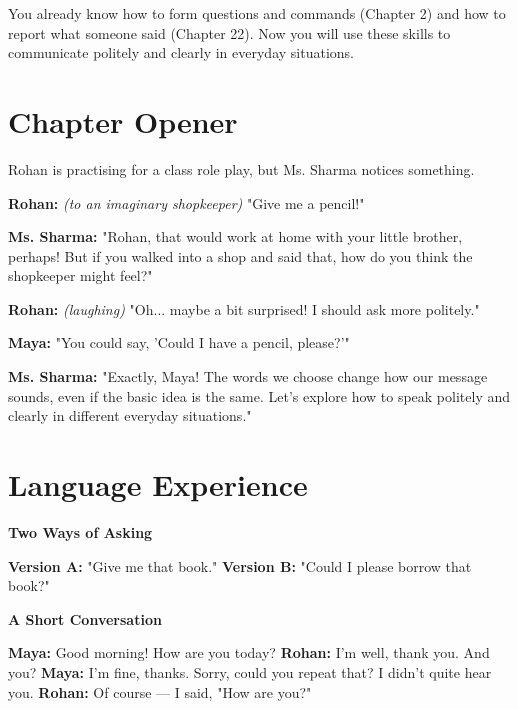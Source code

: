 \begin{rememberbox}
You already know how to form questions and commands (Chapter 2) and how to report what someone said (Chapter 22). Now you will use these skills to communicate politely and clearly in everyday situations.
\end{rememberbox}

\section{Chapter Opener}
Rohan is practising for a class role play, but Ms. Sharma notices something.

\textbf{Rohan:} \textit{(to an imaginary shopkeeper)} "Give me a pencil!"

\textbf{Ms. Sharma:} "Rohan, that would work at home with your little brother, perhaps! But if you walked into a shop and said that, how do you think the shopkeeper might feel?"

\textbf{Rohan:} \textit{(laughing)} "Oh... maybe a bit surprised! I should ask more politely."

\textbf{Maya:} "You could say, 'Could I have a pencil, please?'"

\textbf{Ms. Sharma:} "Exactly, Maya! The words we choose change how our message sounds, even if the basic idea is the same. Let's explore how to speak politely and clearly in different everyday situations."

\section{Language Experience}
\textbf{Two Ways of Asking}

\begin{tcolorbox}[colback=gray!5, colframe=gray!50, sharp corners, boxsep=0pt, left=5pt, right=5pt, top=5pt, bottom=5pt, breakable]
\textbf{Version A:} "Give me that book."
\textbf{Version B:} "Could I please borrow that book?"
\end{tcolorbox}

\textbf{A Short Conversation}

\begin{tcolorbox}[colback=gray!5, colframe=gray!50, sharp corners, boxsep=0pt, left=5pt, right=5pt, top=5pt, bottom=5pt, breakable]
\textbf{Maya:} Good morning! How are you today?
\textbf{Rohan:} I'm well, thank you. And you?
\textbf{Maya:} I'm fine, thanks. Sorry, could you repeat that? I didn't quite hear you.
\textbf{Rohan:} Of course --- I said, "How are you?"
\end{tcolorbox}

